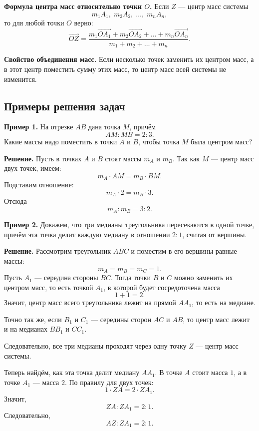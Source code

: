 \medskip

\textbf{Формула центра масс относительно точки $O$.}
Если $Z$ --- центр масс системы
\[
m_1A_1,\; m_2A_2,\; \dots,\; m_nA_n,
\]
то для любой точки $O$ верно:
\[
\overrightarrow{OZ}=
\frac{m_1\overrightarrow{OA_1}+m_2\overrightarrow{OA_2}+\dots+m_n\overrightarrow{OA_n}}
{m_1+m_2+\dots+m_n}.
\]

\medskip

\textbf{Свойство объединения масс.}
Если несколько точек заменить их центром масс, а в этот центр поместить сумму этих масс, то центр масс всей системы не изменится.

\subsection*{Примеры решения задач}

\textbf{Пример 1.}
На отрезке $AB$ дана точка $M$, причём
\[
AM:MB=2:3.
\]
Какие массы надо поместить в точки $A$ и $B$, чтобы точка $M$ была центром масс?

\medskip

\textbf{Решение.}
Пусть в точках $A$ и $B$ стоят массы $m_A$ и $m_B$.
Так как $M$ --- центр масс двух точек, имеем:
\[
m_A\cdot AM=m_B\cdot BM.
\]
Подставим отношение:
\[
m_A\cdot 2 = m_B\cdot 3.
\]
Отсюда
\[
m_A:m_B=3:2.
\]


\bigskip

\textbf{Пример 2.}
Докажем, что три медианы треугольника пересекаются в одной точке, причём эта точка делит каждую медиану в отношении $2:1$, считая от вершины.

\medskip

\textbf{Решение.}
Рассмотрим треугольник $ABC$ и поместим в его вершины равные массы:
\[
m_A=m_B=m_C=1.
\]
Пусть $A_1$ --- середина стороны $BC$.
Тогда точки $B$ и $C$ можно заменить их центром масс, то есть точкой $A_1$, в которой будет сосредоточена масса
\[
1+1=2.
\]
Значит, центр масс всего треугольника лежит на прямой $AA_1$, то есть на медиане.

Точно так же, если $B_1$ и $C_1$ --- середины сторон $AC$ и $AB$, то центр масс лежит и на медианах $BB_1$ и $CC_1$.

Следовательно, все три медианы проходят через одну точку $Z$ --- центр масс системы.

Теперь найдём, как эта точка делит медиану $AA_1$.
В точке $A$ стоит масса $1$, а в точке $A_1$ --- масса $2$.
По правилу для двух точек:
\[
1\cdot ZA = 2\cdot ZA_1.
\]
Значит,
\[
ZA:ZA_1=2:1.
\]
Следовательно,
\[
AZ:ZA_1=2:1.
\]

